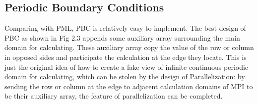\subsection{Periodic Boundary Conditions}
Comparing with PML, PBC is relatively easy to implement.  The best design of PBC as shown in Fig 2.3 appends some
auxiliary array surrounding the main domain for calculating. These auxiliary array copy the value of the row or column
in opposed sides and participate the calculation at the edge they locate. This is just the original idea of how to
create a fake view of infinite continuous periodic domain for calculating, which can be stolen by the design of
Parallelization: by sending the row or column at the edge to adjacent calculation domains of MPI to be their auxiliary
array, the feature of parallelization can be completed.

